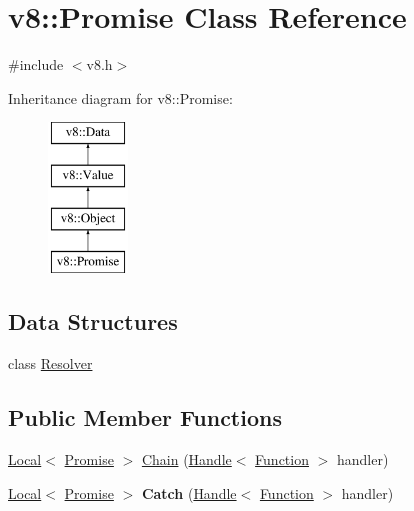 \hypertarget{classv8_1_1Promise}{\section{v8\-:\-:Promise Class Reference}
\label{classv8_1_1Promise}
}


{\ttfamily \#include $<$v8.\-h$>$}

Inheritance diagram for v8\-:\-:Promise\-:\begin{figure}[H]
\begin{center}
\leavevmode
\includegraphics[height=4.000000cm]{classv8_1_1Promise}
\end{center}
\end{figure}
\subsection*{Data Structures}
\begin{DoxyCompactItemize}
\item 
class \hyperlink{classv8_1_1Promise_1_1Resolver}{Resolver}
\end{DoxyCompactItemize}
\subsection*{Public Member Functions}
\begin{DoxyCompactItemize}
\item 
\hyperlink{classv8_1_1Local}{Local}$<$ \hyperlink{classv8_1_1Promise}{Promise} $>$ \hyperlink{classv8_1_1Promise_af56616dc11de23d6d515b0fa5d42e1eb}{Chain} (\hyperlink{classv8_1_1Handle}{Handle}$<$ \hyperlink{classv8_1_1Function}{Function} $>$ handler)
\item 
\hypertarget{classv8_1_1Promise_aab3dea5d0875e1506b9c8fc822b0e005}{\hyperlink{classv8_1_1Local}{Local}$<$ \hyperlink{classv8_1_1Promise}{Promise} $>$ {\bfseries Catch} (\hyperlink{classv8_1_1Handle}{Handle}$<$ \hyperlink{classv8_1_1Function}{Function} $>$ handler)}\label{classv8_1_1Promise_aab3dea5d0875e1506b9c8fc822b0e005}

\end{DoxyCompactItemize}
